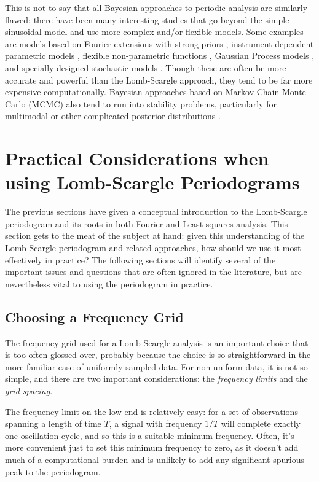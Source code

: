 \documentclass[preprint]{aastex}
\newcommand{\sectlabel}[1]{\label{sect:#1}}
\begin{document}
This is not to say that all Bayesian approaches to periodic analysis are
similarly flawed; there have been many interesting studies that go beyond
the simple sinusoidal model and use more complex and/or flexible models.
Some examples are models based on Fourier
extensions with strong priors \citep[e.g.][]{Bretthorst88},
instrument-dependent parametric models \citep[e.g.][]{Angus16},
flexible non-parametric functions \citep[e.g.][]{Gregory92},
Gaussian Process models \citep[e.g.][]{Wang2012}, and
specially-designed stochastic models \citep[e.g.][]{Kelly14}.
Though these are often be more accurate and powerful than the Lomb-Scargle
approach, they tend to be far more expensive computationally.
Bayesian approaches based on Markov Chain Monte Carlo (MCMC) also tend to
run into stability problems,
particularly for multimodal or other complicated posterior distributions
\citep[See, for example, the RR Lyrae discussion in][]{Kelly14}.

\section{Practical Considerations when using Lomb-Scargle Periodograms}
\sectlabel{practical-considerations}
The previous sections have given a conceptual introduction to the Lomb-Scargle
periodogram and its roots in both Fourier and Least-squares analysis.
This section gets to the meat of the subject at hand:
given this understanding of the Lomb-Scargle periodogram and related
approaches, how should we use it most effectively in practice?
The following sections will identify several of the important issues and
questions that are often ignored in the literature, but are nevertheless
vital to using the periodogram in practice.

\subsection{Choosing a Frequency Grid}
\sectlabel{frequency-grid}
The frequency grid used for a Lomb-Scargle analysis is an important choice
that is too-often glossed-over, probably because the choice is so
straightforward in the more familiar case of uniformly-sampled data.
For non-uniform data, it is not so simple, and there are two important
considerations: the {\it frequency limits} and the {\it grid spacing}.

The frequency limit on the low end is relatively easy: for a set of observations
spanning a length of time $T$,
a signal with frequency $1/T$ will complete exactly one oscillation cycle,
and so this is a suitable minimum frequency.
Often, it's more convenient just to set this minimum frequency to zero, as it
doesn't add much of a computational burden and is unlikely to add any
significant spurious peak to the periodogram.
\end{document}
